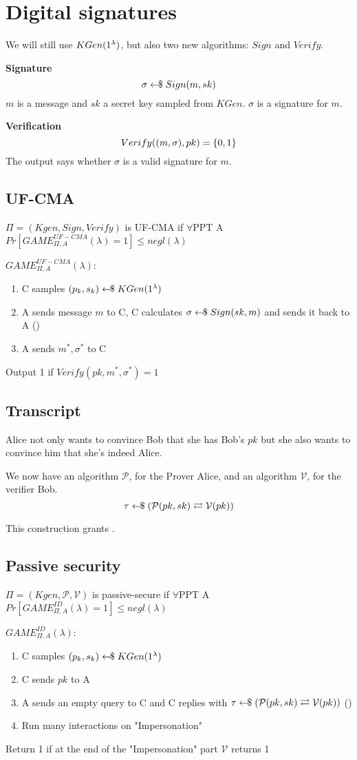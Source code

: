 \chapter{Digital signatures}
We will still use $KGen(1^\lambda)$, but also two new algorithms: $Sign$ and $Verify$.

\textbf{Signature}
\[ \sigma \leftarrow\kern-0.42em{\$} \; Sign(m,sk) \]
$m$ is a message and $sk$ a secret key sampled from $KGen$. $\sigma$ is a signature for $m$.

\textbf{Verification}
\[ Verify((m,\sigma),pk) = \{0,1\} \]
The output says whether $\sigma$ is a valid signature for $m$.


\section{UF-CMA}
$\Pi = (Kgen, Sign, Verify)$ is UF-CMA if $\forall$PPT A $Pr[ GAME_{\Pi,A}^{UF-CMA} (\lambda) = 1 ] \leq negl(\lambda)$

$GAME_{\Pi,A}^{UF-CMA} (\lambda)$:
\begin{enumerate}
    \item C samples $(p_k,s_k) \leftarrow\kern-0.42em{\$} \; KGen(1^\lambda)$
    \item A sends message $m$ to C, C calculates $\sigma \leftarrow\kern-0.42em{\$} \; Sign(sk,m)$ and sends it back to A (\poly)
    \item A sends $m^*,\sigma^*$ to C
\end{enumerate}
Output 1 if $Verify(pk,m^*,\sigma^*) = 1$


\section{Transcript}
Alice not only wants to convince Bob that she has Bob's $pk$  but she also wants to convince him that she's indeed Alice.

We now have an algorithm $\mathcal{P}$, for the Prover Alice, and an algorithm $\mathcal{V}$, for the verifier Bob.
\[ \tau \leftarrow\kern-0.42em{\$} \; (\mathcal{P}(pk,sk) \rightleftarrows \mathcal{V}(pk)) \]

This construction grants .


\section{Passive security} \label{digsign:passsec}
$\Pi = (Kgen, \mathcal{P}, \mathcal{V})$ is passive-secure if $\forall$PPT A $Pr[GAME_{\Pi,A}^{ID}(\lambda) = 1] \leq negl(\lambda)$

$GAME_{\Pi,A}^{ID}(\lambda)$:
\begin{enumerate}
    \item C samples $(p_k,s_k) \leftarrow\kern-0.42em{\$} \; KGen(1^\lambda)$
    \item C sends $pk$ to A
    \item A sends an empty query to C and C replies with $\tau \leftarrow\kern-0.42em{\$} \; (\mathcal{P}(pk,sk) \rightleftarrows \mathcal{V}(pk))$ (\poly)
    \item Run many interactions on "Impersonation"
\end{enumerate}
Return 1 if at the end of the "Impersonation" part $\mathcal{V}$ returns 1

